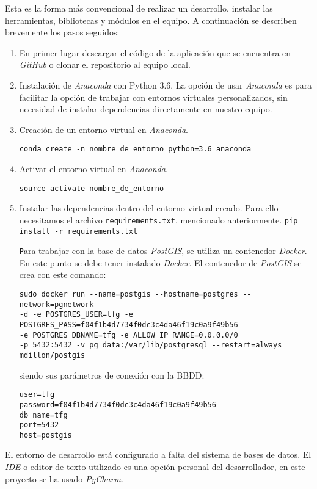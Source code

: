 Esta es la forma más convencional de realizar un desarrollo, instalar  las herramientas, bibliotecas y módulos en el equipo. A continuación se describen brevemente los pasos seguidos:

\begin{enumerate}

\item En primer lugar descargar el código de la aplicación que se encuentra en \emph{GitHub} o clonar el repositorio al equipo local.

\item Instalación de \emph{Anaconda} con Python 3.6. La opción de usar \emph{Anaconda} es para facilitar la opción de trabajar con entornos virtuales personalizados, sin necesidad de instalar dependencias directamente en nuestro equipo.

\item Creación de un entorno virtual en \emph{Anaconda}.

\texttt{conda create -n nombre\_de\_entorno python=3.6 anaconda}

\item Activar el entorno virtual en \emph{Anaconda}.

\texttt{source activate  nombre\_de\_entorno}

\item Instalar las dependencias dentro del entorno virtual creado. Para ello necesitamos el archivo \texttt{requirements.txt}, mencionado anteriormente.
\texttt{pip install -r requirements.txt}

\texttt Para trabajar con la base de datos \emph{PostGIS}, se utiliza un contenedor \emph{Docker}. En este punto se debe tener instalado \emph{Docker}. El contenedor de \emph{PostGIS} se crea con este comando:

\begin{verbatim}
sudo docker run --name=postgis --hostname=postgres --network=pgnetwork
-d -e POSTGRES_USER=tfg -e POSTGRES_PASS=f04f1b4d7734f0dc3c4da46f19c0a9f49b56
-e POSTGRES_DBNAME=tfg -e ALLOW_IP_RANGE=0.0.0.0/0 
-p 5432:5432 -v pg_data:/var/lib/postgresql --restart=always mdillon/postgis
\end{verbatim}

siendo sus parámetros de conexión con la BBDD:

\begin{verbatim}
user=tfg
password=f04f1b4d7734f0dc3c4da46f19c0a9f49b56
db_name=tfg
port=5432
host=postgis

\end{verbatim}


\end{enumerate}
El entorno de desarrollo está configurado a falta del sistema de bases de datos. El \emph{IDE} o editor de texto utilizado es una opción personal del desarrollador, en este proyecto se ha usado \emph{PyCharm}.



